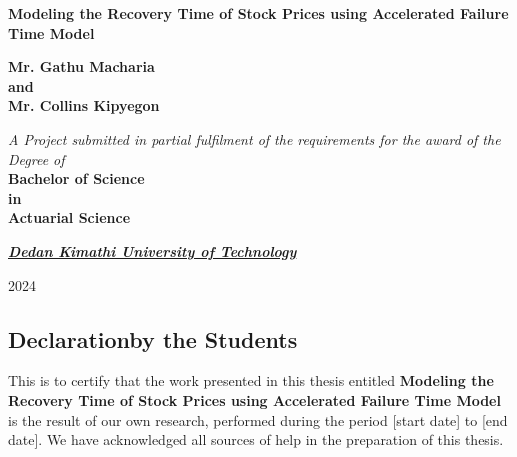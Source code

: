\documentclass[12pt,a4paper,twoside]{Thesis}
\begin{document}
 

\begin{titlepage}
\newcommand{\medium}[1]{\textbf{\textit{#1}}}
    \centering
    \vspace*{1cm}

    \textbf{\LARGE Modeling the Recovery Time of Stock Prices using Accelerated Failure Time Model}

    \vspace{1.5cm}

    \textbf{\Large Mr. Gathu Macharia \\ and \\ 
    \vspace{.5cm}
    Mr. Collins Kipyegon}

    \vspace{3cm}

    \textit{A Project submitted in partial fulfilment of the requirements for the
    award of the Degree of} \\
    \vspace{.5cm}
    \textbf{\Large Bachelor of Science\\  in  \\ 
    \vspace{.5cm}
     Actuarial Science}

    \vspace{2.8cm}

\medium{   \bf{ \href{https://www.dkut.ac.ke}{Dedan Kimathi University of Technology}}}

    \vspace{3.1cm}

    
    2024
    
\end{titlepage}
\newpage
\thispagestyle{empty}
\mbox{}

\newpage

\begin{titlepage}
\section*{Declarationby the Students}

This is to certify that the work presented in this thesis entitled \textbf{Modeling the Recovery Time of Stock Prices using Accelerated Failure Time Model} is the result of our own research, performed during the period [start date] to [end date]. We have acknowledged all sources of help in the preparation of this thesis.

\vspace{1cm}
\end{titlepage}
\end{document}
